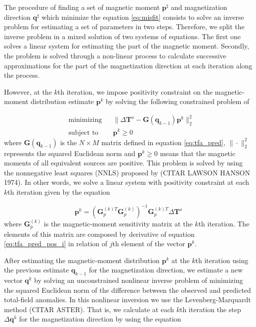 The procedure of finding a set of magnetic moment $\mathbf{p}^\sharp$ and magnetization direction $\mathbf{q}^\sharp$ which minimize the equation \ref{eq:misfit} consists to solve an inverse problem for estimating a set of parameters in two steps. Therefore, we split the inverse problem in a mixed solution of two systems of equations. The first one solves a linear system for estimating the part of the magnetic moment. Secondly, the problem is solved through a non-linear process to calculate successive approximations for the part of the magnetization direction at each iteration along the process. 

However, at the $k$th iteration, we impose positivity constraint on the magnetic-moment distribution estimate $\mathbf{p}^k$ by solving the following constrained problem of

\begin{equation}
	\begin{aligned}
		& \text{minimizing}
		& &\lVert \Delta \mathbf{T}^o - \mathbf{G}(\mathbf{q}_{k-1}) \mathbf{p}^k \rVert_{2}^{2} \\
		& \text{subject to}
		& & \mathbf{p}^k \geqslant 0
	\end{aligned}
	\label{eq:positivity}
\end{equation}
where $\mathbf{G}(\mathbf{q}_{k-1})$ is the $N \times M$ matrix defined in equation \ref{eq:tfa_pred},
$\| \cdot \|_{2}^{2}$ represents the squared Euclidean norm and $\mathbf{p}^k \geqslant 0$ means that the magnetic moments of all equivalent sources are positive. This problem is solved by using the nonnegative least squares (NNLS) proposed by (CITAR LAWSON HANSON 1974). In other words, we solve a linear system with positivity constraint at each $k$th iteration given by the equation 

\begin{equation}
	\mathbf{p}^k = \left(\mathbf{G}_{p}^{(k)T} \mathbf{G}_{p}^{(k)}\right)^{-1} \mathbf{G}_{p}^{(k)T}  \Delta \mathbf{T}^o
	\label{eq:linsys_p}
\end{equation}
where $\mathbf{G}_p^{(k)}$ is the magnetic-moment sensitivity matrix at the $k$th iteration. The elements of this matrix are composed by derivative of equation \ref{eq:tfa_pred_pos_i} in relation of $j$th element of the vector $\mathbf{p}^k$.

After estimating the magnetic-moment distribution $\mathbf{p}^k$ at the $k$th iteration using the previous estimate $\mathbf{q}_{k-1}$ for the magnetization direction, we estimate a new vector $\mathbf{q}^{k}$ by solving an unconstrained nonlinear inverse problem of minimizing the squared Euclidean norm of the difference between the observed and predicted total-field anomalies. In this nonlinear inversion we use the Levenberg-Marquardt method (CITAR ASTER). That is, we calculate at each $k$th iteration the step $\Delta \mathbf{q}^k$ for the magnetization direction by using the equation

